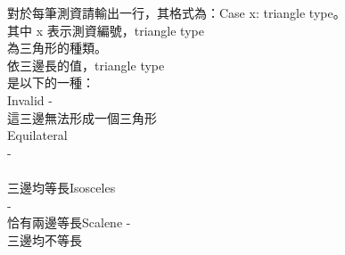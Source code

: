 對於每筆測資請輸出一行，其格式為：Case {x}: {triangle type}。\\
其中 x 表示測資編號，{triangle type}\\
為三角形的種類。\\
依三邊長的值，{triangle type}\\
是以下的一種：\\
Invalid -\\
這三邊無法形成一個三角形\\
Equilateral\\
 -\\
\\
三邊均等長Isosceles\\
 -\\
恰有兩邊等長Scalene -\\
三邊均不等長
